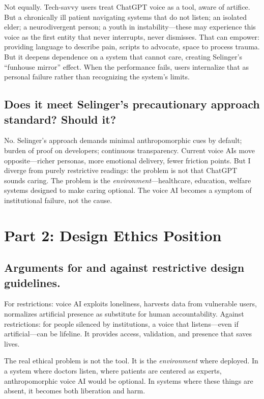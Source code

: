 \documentclass[12pt,twoside]{article}
\begin{document}
Not equally. Tech-savvy users treat ChatGPT voice as a tool, aware of artifice. But a chronically ill patient navigating systems that do not listen; an isolated elder; a neurodivergent person; a youth in instability—these may experience this voice as the first entity that never interrupts, never dismisses. That can empower: providing language to describe pain, scripts to advocate, space to process trauma. But it deepens dependence on a system that cannot care, creating Selinger's \enquote{funhouse mirror} effect. When the performance fails, users internalize that as personal failure rather than recognizing the system's limits.

\subsection*{Does it meet Selinger's precautionary approach standard? Should it?}

No. Selinger's approach demands minimal anthropomorphic cues by default; burden of proof on developers; continuous transparency. Current voice AIs move opposite—richer personas, more emotional delivery, fewer friction points. But I diverge from purely restrictive readings: the problem is not that ChatGPT sounds caring. The problem is the \emph{environment}—healthcare, education, welfare systems designed to make caring optional. The voice AI becomes a symptom of institutional failure, not the cause.

\section*{Part 2: Design Ethics Position}

\subsection*{Arguments for and against restrictive design guidelines.}

For restrictions: voice AI exploits loneliness, harvests data from vulnerable users, normalizes artificial presence as substitute for human accountability. Against restrictions: for people silenced by institutions, a voice that listens—even if artificial—can be lifeline. It provides access, validation, and presence that saves lives.

The real ethical problem is not the tool. It is the \emph{environment} where deployed. In a system where doctors listen, where patients are centered as experts, anthropomorphic voice AI would be optional. In systems where these things are absent, it becomes both liberation and harm.
\end{document}
